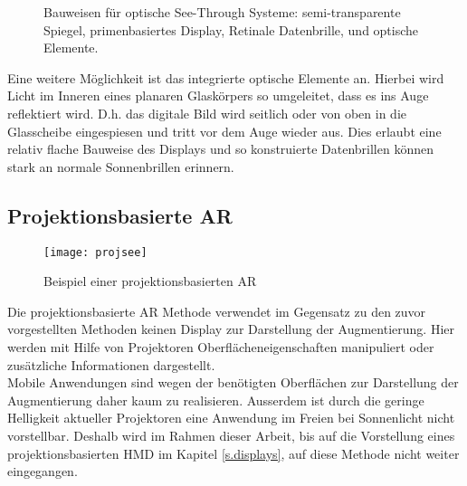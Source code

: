 \subfiglabelskip=0pt
\begin{figure}[h]%
	\centering
	\hspace{8pt}%
	
	\hspace{8pt}%
	\caption[Bauweisen für See-Through Systeme.]
	{Bauweisen für optische See-Through Systeme:
		 semi-transparente Spiegel,
		 primenbasiertes Display,
		 Retinale Datenbrille, und
		 optische Elemente.}%
	\label{fig:see}%
\end{figure}
Eine weitere Möglichkeit ist das integrierte optische Elemente an. Hierbei wird Licht im Inneren eines planaren Glaskörpers so umgeleitet, dass es ins Auge reflektiert wird. D.h. das digitale Bild wird seitlich oder von oben in die Glasscheibe eingespiesen und tritt vor dem Auge wieder aus. Dies erlaubt eine relativ flache Bauweise des Displays und so konstruierte Datenbrillen können stark an normale Sonnenbrillen erinnern.\cite[S.~273~ff.]{doerner13}
\newpage
\subsection*{Projektionsbasierte AR}
\begin{wrapfigure}{r}{0.45\textwidth}
	\vspace{-25pt}
	\begin{center}
		\texttt{[image: projsee]}
	\end{center}
	\vspace{-15pt}
	\captionsetup{width=0.38\textwidth}
	\caption{Beispiel einer projektionsbasierten AR}\label{projsee}
	\vspace{-15pt}
\end{wrapfigure}
Die projektionsbasierte AR Methode verwendet im Gegensatz zu den zuvor vorgestellten Methoden keinen Display zur Darstellung der Augmentierung. Hier werden mit Hilfe von Projektoren Oberflächeneigenschaften manipuliert oder zusätzliche Informationen dargestellt.\cite[S.~249]{doerner13}\\[6pt]
Mobile Anwendungen sind wegen der benötigten Oberflächen zur Darstellung der Augmentierung daher kaum zu realisieren. Ausserdem ist durch die geringe Helligkeit aktueller Projektoren eine Anwendung im Freien bei Sonnenlicht nicht vorstellbar. Deshalb wird im Rahmen dieser Arbeit, bis auf die Vorstellung eines projektionsbasierten HMD im Kapitel \ref{s.displays}, auf diese Methode nicht weiter eingegangen.\\[6pt]
\newpage

